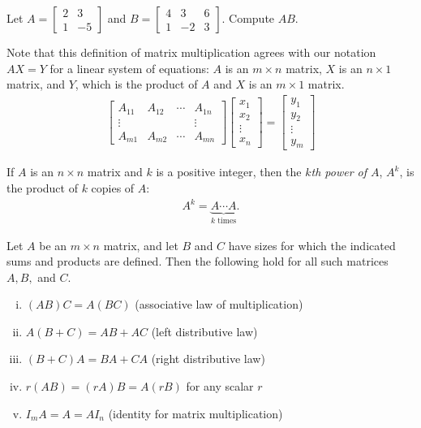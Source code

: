 \documentclass[12pt,letterpaper,reqno]{article}
\numberwithin{equation}{section}
\newcommand{\ti}[1]{\textit{#1}}
\begin{document}
\begin{exercise}
Let $A=\begin{bmatrix}
	2&3\\1&-5
\end{bmatrix}$ and $B=\begin{bmatrix}
	4&3&6 \\1&-2&3
\end{bmatrix}$. Compute $AB$.	
\end{exercise}

Note that this definition of matrix multiplication agrees with our notation $AX=Y$ for a linear system of equations: $A$ is an $m \times n$ matrix, $X$ is an $ n \times 1$ matrix, and $Y$, which is the product of $A$ and $X$ is an $m \times 1$ matrix. 
	\begin{align*}
		\begin{bmatrix}
			A_{11} & A_{12} & \cdots & A_{1n} \\
			\vdots & &  & \vdots \\
			A_{m1} & A_{m2} & \cdots & A_{mn}
		\end{bmatrix}\begin{bmatrix}
			x_1 \\ x_2 \\ \vdots \\ x_n
		\end{bmatrix}=\begin{bmatrix}
			y_1 \\ y_2 \\ \vdots \\ y_m
		\end{bmatrix}
	\end{align*}

\begin{defn}
	If $A$ is an $n\times n$ matrix and $k$ is a positive integer, then the \ti{$k$th power of $A$}, $A^k$, is the product of $k$ copies of $A$:
\begin{align*}
	A^k=\underbrace{A \cdots A}_{\text{$k$ times}}.
\end{align*}
\end{defn}

\begin{thm}\label{thm:properties_of_matrix_multiplication}
	Let $A$ be an $m \times n$ matrix, and let $B$ and $C$ have sizes for which the indicated sums and products are defined. Then the following hold for all such matrices $A,B,$ and $C$.
\begin{enumerate}[(i)]
	\item $(AB)C=A(BC)$ (associative law of multiplication)
	\item $A(B+C)=AB+AC$ (left distributive law)
	\item $(B+C)A=BA+CA$ (right distributive law)
	\item $r(AB)=(rA)B=A(rB)$ for any scalar $r$
	\item $I_mA=A=AI_n$ (identity for matrix multiplication)
\end{enumerate}
\end{thm}
\end{document}
